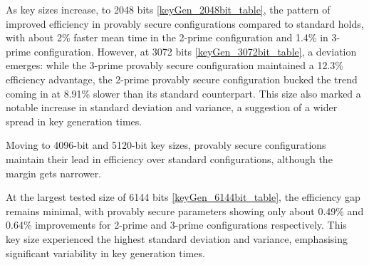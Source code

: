 \documentclass[]{final_report}
\theoremstyle{definition}
\begin{document}
As key sizes increase, to 2048 bits \ref{keyGen_2048bit_table}, the pattern of improved efficiency in provably secure configurations compared to standard holds, with about 2\% faster mean time in the  2-prime configuration and 1.4\% in 3-prime configuration. However, at 3072 bits  \ref{keyGen_3072bit_table}, a deviation emerges: while the 3-prime provably secure configuration maintained a 12.3\% efficiency advantage, the  2-prime provably secure configuration bucked the trend coming in at 8.91\% slower than its standard counterpart. This size also marked a notable increase in standard deviation and variance, a suggestion of a wider spread in key generation times.

Moving to 4096-bit  and 5120-bit key sizes, provably secure configurations maintain their lead in efficiency over standard configurations, although the margin gets narrower. 

 
At the largest tested size of 6144 bits \ref{keyGen_6144bit_table}, the efficiency gap remains minimal, with provably secure parameters showing only about 0.49\% and 0.64\% improvements for 2-prime and 3-prime configurations respectively. This key size experienced the highest standard deviation and variance, emphasising significant variability in key generation times.
\end{document}
